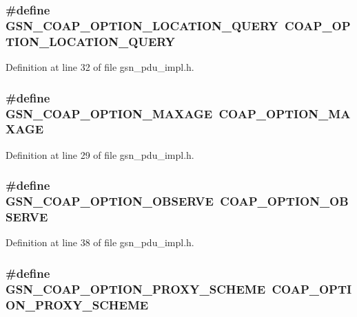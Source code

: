 \hypertarget{a00538_acc7e9240a1bd5c13834932086226047b}{
\subsubsection[{GSN\_\-COAP\_\-OPTION\_\-LOCATION\_\-QUERY}]{\setlength{\rightskip}{0pt plus 5cm}\#define GSN\_\-COAP\_\-OPTION\_\-LOCATION\_\-QUERY~COAP\_\-OPTION\_\-LOCATION\_\-QUERY}}
\label{a00538_acc7e9240a1bd5c13834932086226047b}


Definition at line 32 of file gsn\_\-pdu\_\-impl.h.

\hypertarget{a00538_ac65b49ede9c94084cb44f0ae772672ac}{
\subsubsection[{GSN\_\-COAP\_\-OPTION\_\-MAXAGE}]{\setlength{\rightskip}{0pt plus 5cm}\#define GSN\_\-COAP\_\-OPTION\_\-MAXAGE~COAP\_\-OPTION\_\-MAXAGE}}
\label{a00538_ac65b49ede9c94084cb44f0ae772672ac}


Definition at line 29 of file gsn\_\-pdu\_\-impl.h.

\hypertarget{a00538_a32a86f9ec40bf427952ce5907c4b15c0}{
\subsubsection[{GSN\_\-COAP\_\-OPTION\_\-OBSERVE}]{\setlength{\rightskip}{0pt plus 5cm}\#define GSN\_\-COAP\_\-OPTION\_\-OBSERVE~COAP\_\-OPTION\_\-OBSERVE}}
\label{a00538_a32a86f9ec40bf427952ce5907c4b15c0}


Definition at line 38 of file gsn\_\-pdu\_\-impl.h.

\hypertarget{a00538_a7962b386b8a2d20e7f2078b13990a9c1}{
\subsubsection[{GSN\_\-COAP\_\-OPTION\_\-PROXY\_\-SCHEME}]{\setlength{\rightskip}{0pt plus 5cm}\#define GSN\_\-COAP\_\-OPTION\_\-PROXY\_\-SCHEME~COAP\_\-OPTION\_\-PROXY\_\-SCHEME}}
\label{a00538_a7962b386b8a2d20e7f2078b13990a9c1}


